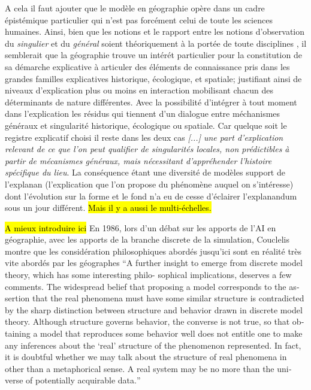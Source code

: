 A cela il faut ajouter que le modèle en géographie opère dans un cadre épistémique particulier qui n'est pas forcément celui de toute les sciences humaines. Ainsi, bien que les notions et le rapport entre les notions d'observation du \textit{singulier} et du \textit{général} soient théoriquement à la portée de toute disciplines \autocite{Dastes1992}, il semblerait que la géographie trouve un intérét particulier pour la constitution de sa démarche explicative à articuler des éléments de connaissance pris dans les grandes familles explicatives historique, écologique, et spatiale; justifiant ainsi de niveaux d'explication plus ou moins en interaction mobilisant chacun des déterminants de nature différentes. Avec la possibilité d'intégrer à tout moment dans l'explication les résidus qui tiennent d'un dialogue entre méchanismes généraux et singularité historique, écologique ou spatiale. Car quelque soit le registre explicatif choisi il reste dans les deux cas \textit{ [...] une part d'explication relevant de ce que l'on peut qualifier de singularités locales, non prédictibles à partir de mécanismes généraux, mais nécessitant d'appréhender l'histoire spécifique du lieu}. La conséquence étant une diversité de modèles support de l'explanan (l’explication que l’on propose du phénomène auquel on s’intéresse) dont l'évolution sur la forme et le fond n'a eu de cesse d'éclairer l'explanandum sous un jour différent. \autocite{Dastes1992, Sanders2000, Sanders2013} \hl{Mais il y a aussi le multi-échelles.}

\hl{A mieux introduire ici} En 1986, lors d'un débat sur les apports de l'AI en géographie, avec les apports de la branche discrete de la simulation, Couclelis montre que les considération philosophiques abordés jusqu'ici sont en réalité très vite abordés par les géographes \foreignquote{english}{A further insight to emerge from discrete model theory, which has some interesting philo- sophical implications, deserves a few comments. The widespread belief that proposing a model corresponds to the assertion that the real phenomena must have some similar structure is contradicted by the sharp distinction between structure and behavior drawn in discrete model theory. Although structure governs behavior, the converse is not true, so that obtaining a model that reproduces some behavior well does not entitle one to make any inferences about the \enquote{real} structure of the phenomenon represented. In fact, it is doubtful whether we may talk about the structure of real phenomena in other than a metaphorical sense. A real system may be no more than the universe of potentially acquirable data.} \autocite{Couclelis1986}

